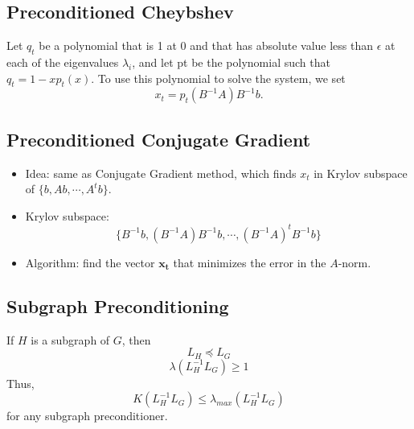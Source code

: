 \subsection{Preconditioned Cheybshev}
Let $q_{t}$ be a polynomial that is 1 at 0 and that has absolute value less than $\epsilon$ at each of the eigenvalues $\lambda_{i}$, and let pt be the polynomial such that $q_{t} = 1 − xp_{t}(x)$. To use this polynomial to solve the system, we set
\[
    x_{t} = p_{t}(B^{−1}A)B^{−1}b.
\]

\subsection{Preconditioned Conjugate Gradient}

\begin{itemize}
    \item Idea: same as Conjugate Gradient method, which finds $x_{t}$ in 
	Krylov subspace of $\{b, Ab, \cdots, A^{t}b\}$.
	\item Krylov subspace:
	\[
	    \{B^{-1}b, (B^{-1}A)B^{-1}b, \cdots, (B^{-1}A)^{t}B^{-1}b\}
	\]
	\item Algorithm: find the vector $\bm{x_{t}}$ that minimizes the error in the $A$-norm.
\end{itemize}

\subsection{Subgraph Preconditioning}
If $H$ is a subgraph of $G$, then
\[
    L_H \preceq L_G
\]
\[
    \lambda(L_H^{-1}L_G) \geq 1
\]
Thus,
\[
    K(L_H^{-1}L_G) \leq \lambda_{max}(L_H^{-1}L_G)
\]
for any subgraph preconditioner.

